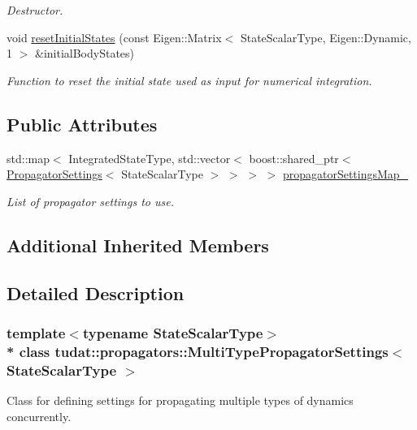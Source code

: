 \begin{DoxyCompactItemize}
\begin{DoxyCompactList}\small\item\em Destructor. \end{DoxyCompactList}\item 
void \hyperlink{classtudat_1_1propagators_1_1MultiTypePropagatorSettings_a146eb15064b1931e1dbe22abce89dfd5}{reset\+Initial\+States} (const Eigen\+::\+Matrix$<$ State\+Scalar\+Type, Eigen\+::\+Dynamic, 1 $>$ \&initial\+Body\+States)
\begin{DoxyCompactList}\small\item\em Function to reset the initial state used as input for numerical integration. \end{DoxyCompactList}\end{DoxyCompactItemize}
\subsection*{Public Attributes}
\begin{DoxyCompactItemize}
\item 
std\+::map$<$ Integrated\+State\+Type, std\+::vector$<$ boost\+::shared\+\_\+ptr$<$ \hyperlink{classtudat_1_1propagators_1_1PropagatorSettings}{Propagator\+Settings}$<$ State\+Scalar\+Type $>$ $>$ $>$ $>$ \hyperlink{classtudat_1_1propagators_1_1MultiTypePropagatorSettings_a82254033e0d25850b5e82b4846bb733c}{propagator\+Settings\+Map\+\_\+}
\begin{DoxyCompactList}\small\item\em List of propagator settings to use. \end{DoxyCompactList}\end{DoxyCompactItemize}
\subsection*{Additional Inherited Members}


\subsection{Detailed Description}
\subsubsection*{template$<$typename State\+Scalar\+Type$>$\\*
class tudat\+::propagators\+::\+Multi\+Type\+Propagator\+Settings$<$ State\+Scalar\+Type $>$}

Class for defining settings for propagating multiple types of dynamics concurrently. 


